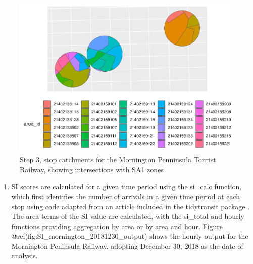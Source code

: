 \documentclass[preprint, 3p,
authoryear]{elsarticle} %
\providecommand{\tightlist}{%
  \setlength{\itemsep}{0pt}\setlength{\parskip}{0pt}}
\begin{document}
\begin{figure}
\includegraphics[width=1\linewidth]{Leveraging_GTFS_to_assess_transit_supply_Transport_Geography_files/figure-latex/calculate_stop_in_or_near_areas_verbose-1} \caption{Step 3, stop catchments for the Mornington Penninsula Tourist Railway, showing intersections with SA1 zones}\label{fig:calculate_stop_in_or_near_areas_verbose}
\end{figure}

\begin{enumerate}
\def\labelenumi{(\arabic{enumi})}
\setcounter{enumi}{4}
\tightlist
\item
  SI scores are calculated for a given time period using the si\_calc
  function, which first identifies the number of arrivals in a given
  time period at each stop using code adapted from an article included
  in the tidytransit package \citep{tidytransit_departure_timetable}.
  The area terms of the SI value are calculated, with the si\_total and
  hourly functions providing aggregation by area or by area and hour.
  Figure @ref(fig:SI\_mornington\_20181230\_output) shows the hourly
  output for the Mornington Peninsula Railway, adopting December 30,
  2018 as the date of analysis.
\end{enumerate}
\end{document}
